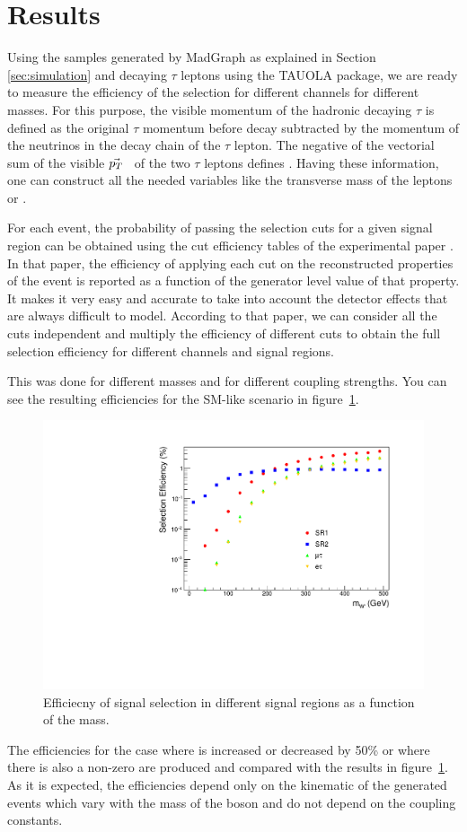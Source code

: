 \section{Results}\label{sec:results} 


Using the \wprime samples generated by MadGraph as explained in Section \ref{sec:simulation} and decaying $\tau$ leptons using the TAUOLA package, we are ready to measure the efficiency of the selection for different channels for different \wprime masses. For this purpose, the visible momentum of the hadronic decaying $\tau$ is defined as the original $\tau$ momentum before decay subtracted by the momentum of the neutrinos in the decay chain of the $\tau$ lepton. The negative of the vectorial sum of the visible $\vec{p_T}$ ~of the two $\tau$ leptons defines \MET. Having these information, one can construct all the needed variables like the transverse mass of the leptons or \mttwo. 

For each event, the probability of passing the selection cuts for a given signal region can be obtained using the cut efficiency tables of the experimental paper \cite{Khachatryan:2016trj}. In that paper, the efficiency of applying each cut on the reconstructed properties of the event is reported as a function of the generator level value of that property. It makes it very easy and accurate to take into account the detector effects that are always difficult to model. According to that paper, we can consider all the cuts independent and multiply the efficiency of different cuts to obtain the full selection efficiency for different channels and signal regions.

This was done for different \wprime masses and for different coupling strengths. You can see the resulting efficiencies for the SM-like scenario in figure~\ref{fig:EfficiencyGraphs}. 
\begin{figure}[!htb]
	\centering
		\includegraphics*[width=.45\textwidth]{figs/EfficiencyGraphs.pdf}
	\caption{Efficiecny of signal selection in different signal regions as a function of the \wprime mass.}
	\label{fig:EfficiencyGraphs}
\end{figure}
The efficiencies for the case where \gL is increased or decreased by 50\% or where there is also a non-zero \gR are produced and compared with the results in 
figure~\ref{fig:EfficiencyGraphs}. As it is expected, the efficiencies depend only on the kinematic of the generated events which vary with the mass of the \wprime boson and do not depend on the coupling constants.


